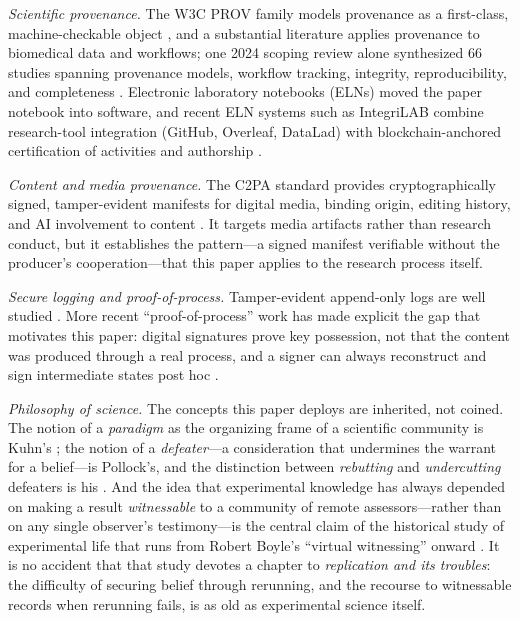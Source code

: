 \documentclass[11pt]{article}
\begin{document}
\emph{Scientific provenance.} The W3C \textsc{PROV} family models provenance as a
first-class, machine-checkable object \parencite{w3cprov2013,moreau2013,moreau2013book}, and
a substantial literature applies provenance to biomedical data and workflows; one 2024
scoping review alone synthesized 66 studies spanning provenance models, workflow
tracking, integrity, reproducibility, and completeness \parencite{gierend2024provenance}.
Electronic laboratory notebooks (\textsc{ELN}s) moved the paper notebook into software,
and recent \textsc{ELN} systems such as IntegriLAB combine research-tool integration
(GitHub, Overleaf, DataLad) with blockchain-anchored certification of activities and
authorship \parencite{easmin2026integrilab}.

\emph{Content and media provenance.} The \textsc{C2PA} standard provides
cryptographically signed, tamper-evident manifests for digital media, binding origin,
editing history, and AI involvement to content \parencite{c2pa2024}. It targets media
artifacts rather than research conduct, but it establishes the pattern---a signed
manifest verifiable without the producer's cooperation---that this paper applies to the
research process itself.

\emph{Secure logging and proof-of-process.} Tamper-evident append-only logs are well
studied \parencite{crosby2009}. More recent ``proof-of-process'' work has made explicit the
gap that motivates this paper: digital signatures prove key possession, not that the
content was produced through a real process, and a signer can always reconstruct and
sign intermediate states post hoc \parencite{condrey2026witnessd}.

\emph{Philosophy of science.} The concepts this paper deploys are inherited, not coined.
The notion of a \emph{paradigm} as the organizing frame of a scientific community is
Kuhn's \parencite{kuhn1962}; the notion of a \emph{defeater}---a consideration that
undermines the warrant for a belief---is Pollock's, and the distinction between
\emph{rebutting} and \emph{undercutting} defeaters is his \parencite{pollock1986}. And the
idea that experimental knowledge has always depended on making a result
\emph{witnessable} to a community of remote assessors---rather than on any single
observer's testimony---is the central claim of the historical study of experimental
life that runs from Robert Boyle's ``virtual witnessing'' onward \parencite{shapin1985}.
It is no accident that that study devotes a chapter to \emph{replication and its
troubles}: the difficulty of securing belief through rerunning, and the recourse to
witnessable records when rerunning fails, is as old as experimental science itself.
\end{document}
